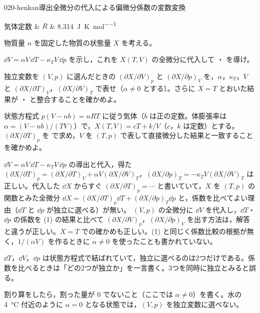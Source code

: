 \documentclass[uplatex,dvipdfmx,a4paper,11pt]{jsarticle}
\begin{document}
\begin{mondai}{020-henkan}{導出}{全微分の代入による偏微分係数の変数変換}
\begin{teisuu}
  気体定数 & $R$ & \qty{8.314}{\joule\per\kelvin\per\mole}\\
\end{teisuu}
物質量 $n$ を固定した物質の状態量 $X$ を考える。
  \begin{shoumon}
    \item $\dd V = \alpha V\,\dd T - \kappa_{T} V\,\dd p$ を示し，これを $X(T,V)$ の全微分に代入して ・ を導け。
    \item 独立変数を $(V,p)$ に選んだときの $(\partial X/\partial V)_{p}$ と $(\partial X/\partial p)_{V}$ を，$\alpha$，$\kappa_{T}$，$V$ と $(\partial X/\partial T)_{V}$，$(\partial X/\partial V)_{T}$ で表せ（$\alpha \neq 0$ とする）。さらに $X = T$ とおいた結果が ・ と整合することを確かめよ。
    \item 状態方程式 $p(V - nb) = nRT$ に従う気体（$b$ は正の定数。体膨張率は $\alpha = (V - nb)/(TV)$）で，$X(T,V) = cT + k/V$（$c$，$k$ は定数）とする。$(\partial X/\partial T)_{p}$ を  で求め，$V$ を $(T,p)$ で表して直接微分した結果と一致することを確かめよ。
  \end{shoumon}

\begin{kotaeran}
   $\dd V=\alpha V\,\dd T-\kappa_{T}V\,\dd p$ の導出と代入，得た $(\partial X/\partial T)_{p}=(\partial X/\partial T)_{V}+\alpha V(\partial X/\partial V)_{T}$，$(\partial X/\partial p)_{T}=-\kappa_{T}V(\partial X/\partial V)_{T}$ は正しい。代入した $\dd X$ からすぐ $(\partial X/\partial T)_{p}=\cdots$ と書いていて，$X$ を $(T,p)$ の関数とみた全微分 $\dd X=(\partial X/\partial T)_{p}\dd T+(\partial X/\partial p)_{T}\dd p$ と，係数を比べてよい理由（$\dd T$ と $\dd p$ が独立に選べる）が無い。
   $(V,p)$ の全微分に $\dd V$ を代入し，$\dd T$・$\dd p$ の係数を (1) の結果と比べて $(\partial X/\partial V)_{p}$，$(\partial X/\partial p)_{V}$ を出す方法は，解答と違うが正しい。$X=T$ での確かめも正しい。(1) と同じく係数比較の根拠が無く，$1/(\alpha V)$ を作るときに $\alpha\neq0$ を使ったことも書かれていない。
\end{kotaeran}
\begin{rikai}
  \item $\dd T$，$\dd V$，$\dd p$ は状態方程式で結ばれていて，独立に選べるのは2つだけである。係数を比べるときは「どの2つが独立か」を一言書く。3つを同時に独立とみると誤る。
  \item 割り算をしたら，割った量が 0 でないこと（ここでは $\alpha\neq0$）を書く。水の \qty{4}{\degreeCelsius} 付近のように $\alpha=0$ となる状態では，$(V,p)$ を独立変数に選べない。
\end{rikai}
\end{mondai}
\end{document}
